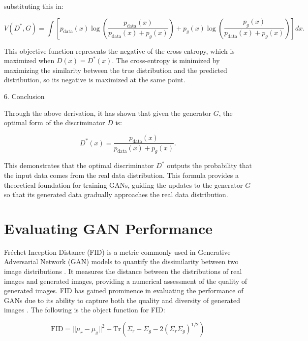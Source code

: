 substituting this in:

\begin{equation}
    V(D^*, G) = \int \left[ p_{\text{data}}(x) \log \left( \frac{p_{\text{data}}(x)}{p_{\text{data}}(x) + p_g(x)} \right) + p_g(x) \log \left( \frac{p_g(x)}{p_{\text{data}}(x) + p_g(x)} \right) \right] dx.
\end{equation}

This objective function represents the negative of the cross-entropy, which is maximized when \( D(x) = D^*(x) \).
The cross-entropy is minimized by maximizing the similarity between the true distribution and the predicted distribution, 
so its negative is maximized at the same point.

6. Conclusion

Through the above derivation, it has shown that given the generator \( G \), the optimal form of the discriminator \( D \) is:

\begin{equation}
    D^*(x) = \frac{p_{\text{data}}(x)}{p_{\text{data}}(x) + p_g(x)}.
\end{equation}

This demonstrates that the optimal discriminator \( D^* \) outputs the probability that the input data comes from the 
real data distribution. 
This formula provides a theoretical foundation for training GANs, guiding the updates to the generator \( G \) so that 
its generated data gradually approaches the real data distribution.


\section{Evaluating GAN Performance}


Fréchet Inception Distance (FID) is a metric commonly used in Generative Adversarial Network (GAN) models 
to quantify the dissimilarity between two image distributions \citep{10.48550/arxiv.2203.06026}. 
It measures the distance between the distributions of real images and generated images, providing 
a numerical assessment of the quality of generated images. FID has gained prominence in evaluating 
the performance of GANs due to its ability to capture both the quality and diversity of generated images \citep{10.3390/app12157599}.
The following is the object function for FID:


\begin{equation}
    \text{FID} = || \mu_r - \mu_g ||^2 + \text{Tr}(\Sigma_r + \Sigma_g - 2(\Sigma_r \Sigma_g)^{1/2})
\end{equation}


